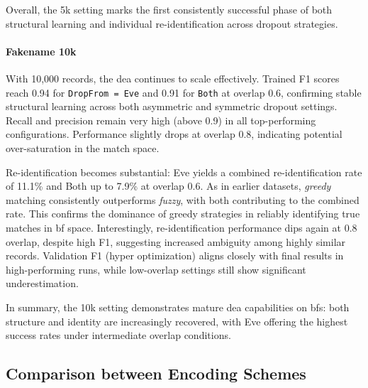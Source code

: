 Overall, the 5k setting marks the first consistently successful phase of both structural learning and individual re-identification across dropout strategies.


\paragraph{Fakename 10k}

With 10{,}000 records, the \ac{dea} continues to scale effectively.
Trained F1 scores reach 0.94 for \texttt{DropFrom = Eve} and 0.91 for \texttt{Both} at overlap 0.6, confirming stable structural learning across both asymmetric and symmetric dropout settings.
Recall and precision remain very high (above 0.9) in all top-performing configurations.
Performance slightly drops at overlap 0.8, indicating potential over-saturation in the match space.

Re-identification becomes substantial: Eve yields a combined re-identification rate of 11.1\% and Both up to 7.9\% at overlap 0.6.
As in earlier datasets, \emph{greedy} matching consistently outperforms \emph{fuzzy}, with both contributing to the combined rate.
This confirms the dominance of greedy strategies in reliably identifying true matches in \ac{bf} space.
Interestingly, re-identification performance dips again at 0.8 overlap, despite high F1, suggesting increased ambiguity among highly similar records.
Validation F1 (hyper optimization) aligns closely with final results in high-performing runs, while low-overlap settings still show significant underestimation.

In summary, the 10k setting demonstrates mature \ac{dea} capabilities on \ac{bf}s: both structure and identity are increasingly recovered, with Eve offering the highest success rates under intermediate overlap conditions.

\subsection{Comparison between Encoding Schemes}







